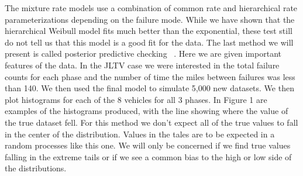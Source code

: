 \documentclass[12pt]{article}
\begin{document}
The mixture rate models use a combination of common rate and hierarchical rate
parameterizations depending on the failure mode.  While we have shown that the
hierarchical Weibull model fits much better than the exponential, these test
still do not tell us that this model is a good fit for the data.  The last
method we will present is called posterior predictive checking ~\cite{ref3}.
Here we are given important features of the data. In the JLTV case we were
interested in the total failure counts for each phase and the number of time the
miles between failures was less than 140.  We then used the final model to
simulate 5,000 new datasets.  We then plot histograms for each of the 8 vehicles
for all 3 phases.  In Figure 1 are examples of the histograms produced, with the
line showing where the value of the true dataset fell.  For this method we don’t
expect all of the true values to fall in the center of the distribution.  Values
in the tales are to be expected in a random processes like this one.  We will
only be concerned if we find true values falling in the extreme tails or if we
see a common bias to the high or low side of the distributions.
\end{document}
